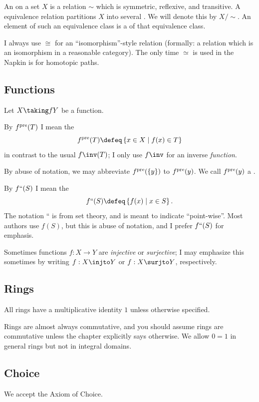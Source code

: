 
An  on a set $X$ is a relation $\sim$
which is symmetric, reflexive, and transitive.
A equivalence relation partitions $X$ into several .
We will denote this by $X / {\sim}$.
An element of such an equivalence class is a  of that equivalence class.

I always use $\cong$ for an ``isomorphism''-style relation
(formally: a relation which is an isomorphism in a reasonable category).
The only time $\simeq$ is used in the Napkin is for homotopic paths.

\subsection*{Functions}
Let $X \taking f Y$ be a function.

\begin{itemize}
\ii By $f^{\text{pre}}(T)$ I mean the 
\[ f\pre(T) \defeq \left\{ x \in X \mid f(x) \in T \right\} \]
in contrast to the usual $f\inv(T)$; I only use $f\inv$ for an inverse \emph{function}.

By abuse of notation, we may abbreviate $f^{\text{pre}}(\{y\})$ to $f^{\text{pre}}(y)$.
We call $f^{\text{pre}}(y)$ a .

\ii By $f``(S)$ I mean the 
\[ f``(S) \defeq \left\{ f(x) \mid x \in S \right\}. \]
The notation {``} is from set theory, and is meant to indicate ``point-wise''.
Most authors use $f(S)$, but this is abuse of notation,
and I prefer $f``(S)$ for emphasis.

\ii Sometimes functions $f : X \to Y$ are \emph{injective} or \emph{surjective};
I may emphasize this sometimes by writing $f : X \injto Y$ or $f : X \surjto Y$, respectively.
\end{itemize}

\subsection*{Rings}
All rings have a multiplicative identity $1$ unless otherwise specified.

Rings are almost always commutative, and you should assume rings are
commutative unless the chapter explicitly says otherwise.
We allow $0=1$ in general rings but not in integral domains.


\subsection*{Choice}
We accept the Axiom of Choice.
